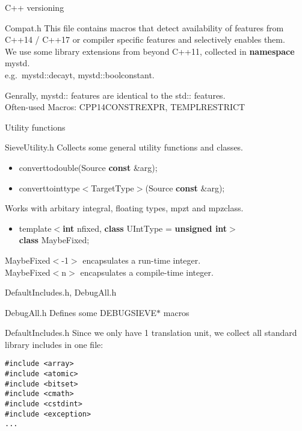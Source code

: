 \documentclass{beamer}
\begin{document}
\begin{frame}{C++ versioning}
\begin{block}{Compat.h}
This file contains macros that detect availability of features from C++14 / C++17 or compiler specific features and selectively enables them.\\[2ex]
We use some library extensions from beyond C++11, collected in \textbf{namespace} mystd.\\
e.g.\ mystd::decay\textunderscore t, mystd::bool\textunderscore constant.

\vspace{2ex}

Genrally, mystd:: features are identical to the std:: features.\\
Often-used Macros: CPP14CONSTREXPR, TEMPL\textunderscore RESTRICT\textunderscore * 
\end{block}
\end{frame}

\begin{frame}{Utility functions}
\begin{block}{SieveUtility.h}
Collects some general utility functions and classes.
\vspace{1ex}
\begin{itemize}
 \item convert\textunderscore to\textunderscore double(Source \textbf{const} \&arg);
 \item convert\textunderscore to\textunderscore inttype$<$TargetType$>$(Source \textbf{const} \&arg);
\end{itemize}
Works with arbitary integral, floating types, mpz\textunderscore t and mpz\textunderscore class.
\begin{itemize}
 \item template$<$\textbf{int} nfixed, \textbf{class} UIntType = \textbf{unsigned int}$>$\\
       \textbf{class} MaybeFixed;
\end{itemize}
MaybeFixed$<$-1$>$ encapsulates a run-time integer.\\
MaybeFixed$<$n$>$ encapsulates a compile-time integer.
\end{block}
\end{frame}

\begin{frame}[fragile]{DefaultIncludes.h, DebugAll.h}
\begin{block}{DebugAll.h}
Defines some DEBUG\textunderscore SIEVE\textunderscore $\ast$  macros
\end{block}
\begin{block}{DefaultIncludes.h}
Since we only have 1 translation unit, we collect all standard library includes in one file:
\begin{verbatim}
#include <array>
#include <atomic>
#include <bitset>
#include <cmath>
#include <cstdint>
#include <exception>
...
\end{verbatim}
\end{block}
\end{frame}
\end{document}

